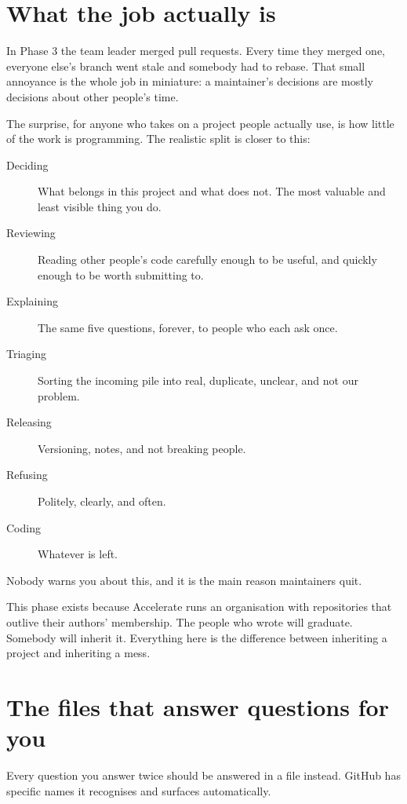 \documentclass[11pt]{article}
\begin{document}
\maketitlepage

\section{What the job actually is}

In Phase 3 the team leader merged pull requests. Every time they merged one,
everyone else's branch went stale and somebody had to rebase. That small annoyance
is the whole job in miniature: a maintainer's decisions are mostly decisions about
other people's time.

The surprise, for anyone who takes on a project people actually use, is how little
of the work is programming. The realistic split is closer to this:

\begin{description}
  \item[Deciding] What belongs in this project and what does not. The most valuable
    and least visible thing you do.
  \item[Reviewing] Reading other people's code carefully enough to be useful, and
    quickly enough to be worth submitting to.
  \item[Explaining] The same five questions, forever, to people who each ask once.
  \item[Triaging] Sorting the incoming pile into real, duplicate, unclear, and not
    our problem.
  \item[Releasing] Versioning, notes, and not breaking people.
  \item[Refusing] Politely, clearly, and often.
  \item[Coding] Whatever is left.
\end{description}

Nobody warns you about this, and it is the main reason maintainers quit.

\begin{why}
This phase exists because Accelerate runs an organisation with repositories that
outlive their authors' membership. The people who wrote  will
graduate. Somebody will inherit it. Everything here is the difference between
inheriting a project and inheriting a mess.
\end{why}

\section{The files that answer questions for you}

Every question you answer twice should be answered in a file instead. GitHub has
specific names it recognises and surfaces automatically.
\end{document}
